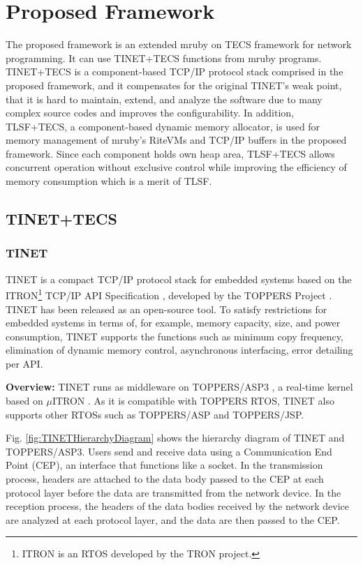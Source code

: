 \documentclass[a4j,12pt,oneside,openany,english]{jsbook}
\begin{document}
\chapter{Proposed Framework}
\label{sec:Proposed Framework}

The proposed framework is an extended mruby on TECS framework for network programming.
It can use TINET+TECS functions from mruby programs.
TINET+TECS is a component-based TCP/IP protocol stack comprised in the proposed framework, and it compensates for the original TINET's weak point, that it is hard to maintain, extend, and analyze the software due to many complex source codes and improves the configurability.
In addition, TLSF+TECS, a component-based dynamic memory allocator, is used for memory management of mruby's RiteVMs and TCP/IP buffers in the proposed framework.
Since each component holds own heap area, TLSF+TECS allows concurrent operation without exclusive control while improving the efficiency of memory consumption which is a merit of TLSF.


\section{TINET+TECS}
\label{sec:TINET+TECS}

\subsection{TINET}

TINET is a compact TCP/IP protocol stack for embedded systems based on the ITRON\footnote{ITRON is an RTOS developed by the TRON project.} TCP/IP API Specification \cite{url:ITRON_TCP/IP_API_Spec}, developed by the TOPPERS Project \cite{url:TOPPERS}.
TINET has been released as an open-source tool.
To satisfy restrictions for embedded systems in terms of, for example, memory capacity, size, and power consumption, TINET supports the functions such as minimum copy frequency, elimination of dynamic memory control, asynchronous interfacing, error detailing per API.

{\bf Overview:}
TINET runs as middleware on TOPPERS/ASP3 \cite{par:ASP3} \cite{url:ASP3}, a real-time kernel based on $\mu$ITRON \cite{par:microITRON}.
As it is compatible with TOPPERS RTOS, TINET also supports other RTOSs such as TOPPERS/ASP and TOPPERS/JSP.

Fig. \ref{fig:TINETHierarchyDiagram} shows the hierarchy diagram of TINET and TOPPERS/ASP3.
Users send and receive data using a Communication End Point (CEP), an interface that functions like a socket.
In the transmission process, headers are attached to the data body passed to the CEP at each protocol layer before the data are transmitted from the network device.
In the reception process, the headers of the data bodies received by the network device are analyzed at each protocol layer, and the data are then passed to the CEP.
\end{document}
